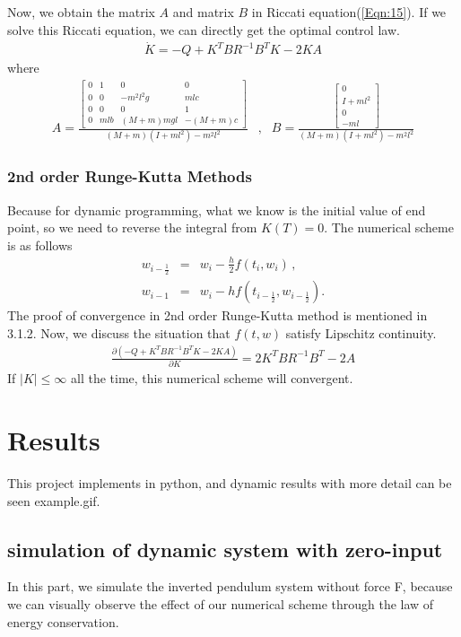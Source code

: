 \documentclass[a4paper,11pt]{article}
\begin{document}
Now, we obtain the matrix $A$ and matrix $B$ in Riccati equation(\ref{Eqn:15}). If we solve this Riccati equation, we can directly get the optimal control law.
\begin{eqnarray}
	\dot K  = - Q + K^TBR^{-1}B^TK - 2KA 
\end{eqnarray}
where
\begin{eqnarray}
	A = \frac{\begin{bmatrix}
		0 & 1 & 0 & 0\\
		0 & 0 & -m^2l^2g & mlc\\
		0 & 0 & 0 & 1\\
		0 & mlb & (M+m)mgl & -(M+m)c
	   \end{bmatrix}}{(M+m)(I+ml^2)-m^2l^2} &,&
	B = \frac{\begin{bmatrix}
		0 \\
		I+ml^2 \\
		0 \\
		-ml
		\end{bmatrix}}{(M+m)(I+ml^2)-m^2l^2}
\end{eqnarray}
\subsubsection{2nd order Runge-Kutta Methods}
Because for dynamic programming, what we know is the initial value of end point, so we need to reverse the 
integral from $K(T) = 0$. The numerical scheme is as follows
\begin{eqnarray}
	w_{i-\frac{1}{2}} &=& w_{i}-\frac{h}{2}f(t_i,w_i) \, , \nonumber \\
	w_{i-1} &=& w_i-hf(t_{i-\frac{1}{2}},w_{i-\frac{1}{2}}). \label{Eqn:24}
\end{eqnarray}
The proof of convergence in 2nd order Runge-Kutta method is mentioned in 3.1.2. Now, we discuss the situation that $f(t,w)$ satisfy Lipschitz continuity.
\begin{eqnarray}
	\frac{\partial (- Q + K^TBR^{-1}B^TK - 2KA)}{\partial K} =2K^TBR^{-1}B^T-2A \nonumber
\end{eqnarray}
If $|K| \le \infty$ all the time, this numerical scheme will convergent.

\section{Results}
This project implements in python, and dynamic results with more detail can be seen example.gif.
\subsection{simulation of dynamic system with zero-input}
In this part, we simulate the inverted pendulum system without force F, because we can visually observe the 
effect of our numerical scheme through the law of energy conservation. 
\end{document}
